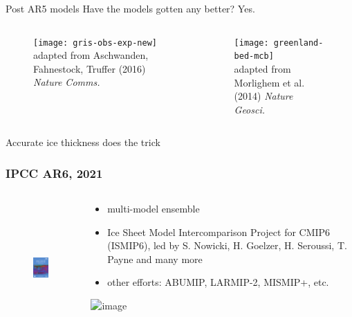 \documentclass[hide notes,intlimits]{beamer}
\begin{document}
\begin{frame}{Post AR5 models}
  \alert{Have the models gotten any better? Yes.}
  \begin{columns}[c]
    \begin{column}{.6\linewidth}
    \begin{figure}
      \texttt{[image: gris-obs-exp-new]}
      \\ \tiny{adapted from Aschwanden, Fahnestock, Truffer (2016) \textit{Nature Comms.}}
    \end{figure}
    \end{column}
    \begin{column}{.4\linewidth}
      \begin{figure}
        \texttt{[image: greenland-bed-mcb]}
      \\ \tiny{adapted from Morlighem et al. (2014) \textit{Nature Geosci.}}
      \end{figure}
    \end{column}
  \end{columns}
  \alert{Accurate ice thickness does the trick}
  
\end{frame}


\begin{frame}
  \frametitle{IPCC AR6, 2021}
  \begin{columns}[c]
    \begin{column}{.4\linewidth}
      \begin{figure}
        \includegraphics[height=5cm]{ar6-wg1}
      \end{figure}
    \end{column}
    \begin{column}{.6\linewidth}
      \begin{itemize}
      \item multi-model ensemble
      \item Ice Sheet Model Intercomparison Project for CMIP6 (ISMIP6), led by S. Nowicki, H. Goelzer, H. Seroussi, T. Payne and many more
      \item other efforts: ABUMIP, LARMIP-2, MISMIP+, etc.
      \end{itemize}
        \includegraphics<1>[width=2.5cm]{ismip6_logo}
    \end{column}
  \end{columns}
\end{frame}
\end{document}
